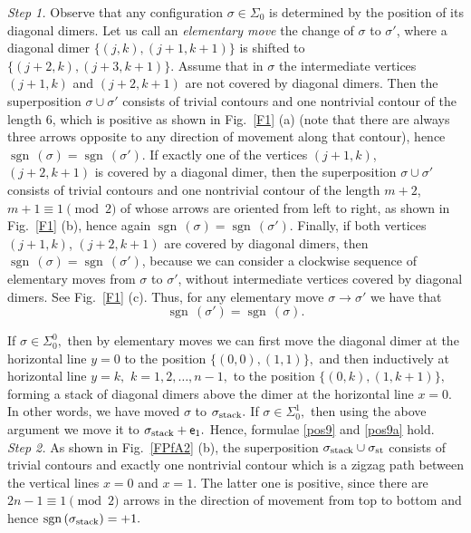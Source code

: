 \documentclass[12pt,reqno]{amsart}
\numberwithin{equation}{section}
\newcommand{\sg}{\sigma}
\newcommand{\sgn}{{\operatorname{sgn}\,}}
\begin{document}
{\it Step 1.} Observe that any configuration $\sg\in\Sigma_{0}$ is determined
by the position of its diagonal dimers. Let us call an {\it elementary move} the change of $\sg$ to $\sg'$, 
where a diagonal dimer $\{(j,k),(j+1,k+1)\}$ is shifted
 to $\{(j+2,k),(j+3,k+1)\}$. Assume that in $\sg$ the intermediate vertices $(j+1,k)$ and $(j+2,k+1)$
are not covered by diagonal dimers.
Then the superposition $\sg\cup\sg'$ consists of trivial contours and one nontrivial
contour of the length 6, which is positive as shown in Fig.\ \ref{F1} (a) (note that there are always three arrows opposite to any direction of movement along that contour), hence $\sgn(\sg)=\sgn(\sg')$. If exactly one of the vertices $(j+1,k)$, 
 $(j+2,k+1)$ is covered by a diagonal dimer, then the superposition $\sg\cup\sg'$ consists of trivial contours and one nontrivial
contour of the length $m+2$, $m+1\equiv 1\pmod 2$ of whose arrows are oriented from left to right, as shown in Fig.\ \ref{F1} (b), hence again $\sgn(\sg)=\sgn(\sg')$. Finally, if both 
vertices $(j+1,k)$, 
$(j+2,k+1)$ are covered by diagonal dimers, then $\sgn(\sg)=\sgn(\sg')$, because we can consider
a clockwise sequence of elementary moves from $\sg$ to $\sg'$, without intermediate vertices covered by diagonal dimers. See Fig.\ \ref{F1} (c). Thus, for any elementary move $\sg\to\sg'$ we have that
\begin{equation}\label{sgn-elem}
\sgn(\sigma')=\sgn(\sigma).
\end{equation}

If $\sg\in\Sigma_{0}^{0},$ then by elementary moves we can first move the diagonal dimer at the horizontal line $y=0$ to the position  $\{(0,0), (1,1)\},$ and then inductively at horizontal line $y=k,$ $k = 1, 2, \ldots, n-1,$ to the position  $\{(0,k), (1,k+1)\},$ forming a stack of diagonal dimers above the dimer at the horizontal line $x=0.$ In other words, we have moved $\sg$ to $\sg_{\rm stack}.$ If $\sg\in\Sigma_{0}^{1},$ then using the above argument we move it to $\sg_ {\rm stack}+\mathsf e_1.$ Hence, formulae \eqref{pos9} and \eqref{pos9a} hold.\\

{\it Step 2.} As shown in Fig.\ \ref{FPfA2} (b),
the superposition $\sigma_{\rm stack}\cup\sigma_{\rm st}$ consists of
trivial contours and exactly one nontrivial contour which is a zigzag path between the vertical lines $x=0$ and $x=1$. The latter one is positive, since there are $2n-1\equiv 1\pmod 2$ arrows in the direction of movement from top to bottom and hence $\sgn(\sg_{\rm stack})=+1.$ 
\end{document}
